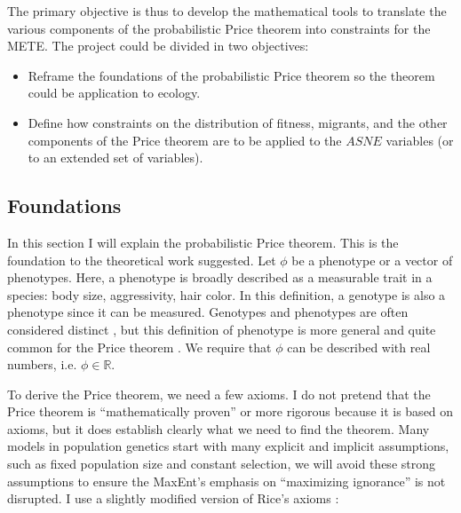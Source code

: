 \documentclass[letterpaper,12pt]{article}
\begin{document}
The primary objective is thus to develop the mathematical tools to
translate the various components of the probabilistic Price theorem into
constraints for the METE. The project could be divided in two objectives:

\begin{itemize}
  \item Reframe the foundations of the probabilistic Price theorem so the
  theorem could be application to ecology.
  \item Define how constraints on the distribution of fitness, migrants, and
  the other components of the Price theorem are to be applied to the $ASNE$
  variables (or to an extended set of variables).
\end{itemize}

\subsection{Foundations}\label{pro:price}

In this section I will explain the probabilistic Price theorem. This is the
foundation to the theoretical work suggested. Let $\phi$ be a phenotype or a
vector of phenotypes. Here, a phenotype is broadly described as a measurable
trait in a species: body size, aggressivity, hair color. In this definition,
a genotype is also a phenotype since it can be measured. Genotypes and
phenotypes are often considered distinct \cite{gri08}, but this definition
of phenotype is more general and quite common for the Price theorem \cite
{ric04}. We require that $\phi$ can be described with real numbers, i.e.
$\phi \in \mathbb{R}$.

To derive the Price theorem, we need a few axioms. I do not pretend that the
Price theorem is ``mathematically proven'' or more rigorous because it is
based on axioms, but it does establish clearly what we need to find the
theorem. Many models in population genetics start with many explicit and
implicit assumptions, such as fixed population size and constant selection,
we will avoid these strong assumptions to ensure the MaxEnt's emphasis on
``maximizing ignorance'' \cite{jay03} is not disrupted. I use a slightly
modified version of Rice's axioms \cite{ric09}:
\end{document}
